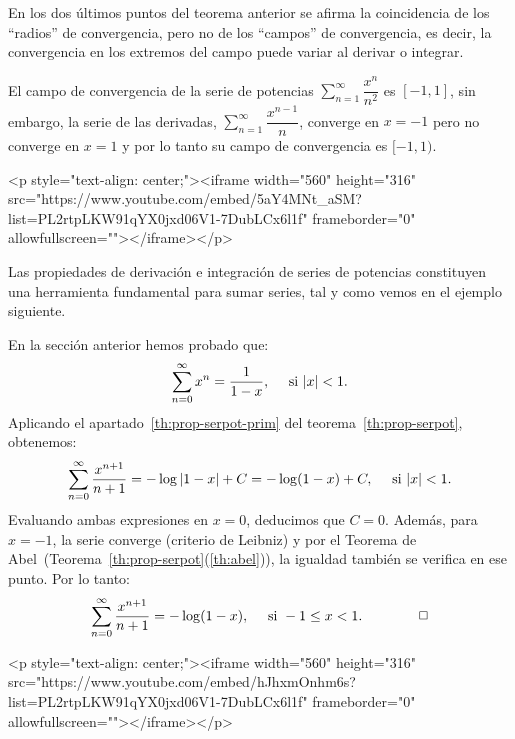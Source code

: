 En los dos últimos puntos del teorema anterior se afirma la coincidencia de los ``radios'' de
convergencia, pero no de los ``campos'' de convergencia, es decir, la convergencia en los extremos
del campo puede variar al derivar o integrar.

\begin{ejemplo}
El campo de convergencia de la serie de potencias $\displaystyle\sum_{n=1}^\infty  \dfrac{x^n}{n^2}$ es $[-1,1]$, sin embargo, la serie de las derivadas, $\displaystyle\sum_{n=1}^\infty  \dfrac{x^{n-1}}{n}$, converge en $x=-1$ pero no converge en $x=1$ y por lo tanto su campo de convergencia es $[-1,1)$.\fej
\end{ejemplo}

\begin{rawhtml}
<p style="text-align: center;"><iframe width="560" height="316" src="https://www.youtube.com/embed/5aY4MNt_aSM?list=PL2rtpLKW91qYX0jxd06V1-7DubLCx6l1f" frameborder="0" allowfullscreen=""></iframe></p>
\end{rawhtml}

Las propiedades de derivación e integración de series de potencias constituyen una herramienta fundamental para sumar series, tal y como vemos en el ejemplo siguiente.

\begin{ejemplo}\label{ej:log}
En la sección anterior hemos probado que:
\[
\displaystyle\sum_{n=0}^\infty   x^n =\dfrac1{1-x},\quad \text{ si } |x|< 1.
\]
Aplicando el apartado~\ref{th:prop-serpot-prim} del teorema~\ref{th:prop-serpot}, obtenemos:
\[
\displaystyle\sum_{n=0}^\infty   \dfrac{x^{n+1}}{n+1} =-\log|1-x| +C=-\log(1-x) +C,\quad  \text{ si } |x|< 1.
\]
Evaluando ambas expresiones en $x=0$, deducimos que $C=0$. Además, para $x=-1$, la serie converge (criterio de Leibniz) y por el Teorema de Abel~(Teorema~\ref{th:prop-serpot}(\ref{th:abel})), la igualdad también se verifica en ese punto. Por lo tanto:
\begin{equation}
\displaystyle\sum_{n=0}^\infty   \dfrac{x^{n+1}}{n+1} =-\log(1-x),\quad  \text{ si } -1\le x\sle 1.\tag*{\fej}
\end{equation}
\end{ejemplo}

\begin{rawhtml}
<p style="text-align: center;"><iframe width="560" height="316" src="https://www.youtube.com/embed/hJhxmOnhm6s?list=PL2rtpLKW91qYX0jxd06V1-7DubLCx6l1f" frameborder="0" allowfullscreen=""></iframe></p>
\end{rawhtml}

